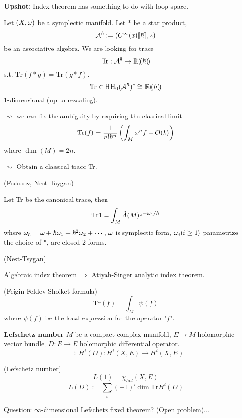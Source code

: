 \textbf{Upshot:} Index theorem has something to do with loop space.

Let $(X,\omega)$ be a symplectic manifold. Let $*$ be a star product,
$$\mathcal{A}^\hbar:=(C^\infty(x)[\![\hbar]\!],*)$$
be an associative algebra. We are looking for trace
$$\text{Tr}:\mathcal{A}^\hbar\to\mathbb{R}(\!(\hbar)\!)$$
s.t. $\text{Tr}(f*g)=\text{Tr}(g*f)$. 
$$
  \text{Tr}\in\operatorname{HH}_0(\mathcal{A}^\hbar)^*
\cong\mathbb{R}(\!(\hbar)\!)
$$
$1$-dimensional (up to rescaling).

$\rightsquigarrow$ we can fix the ambiguity by requiring the classical limit
$$
  \text{Tr}(f)
=
  \frac{1}{n!\hbar^n}
  \left(
    \int_M \omega^nf+O(\hbar)
  \right)
$$
where $\dim(M)=2n$.

$\rightsquigarrow$ Obtain a classical trace Tr.

\begin{thm}(Fedosov, Nest-Tsygan)

Let Tr be the canonical trace, then
$$
  \text{Tr}1
=
  \int_M
    \hat{A}(M)e^{-\omega_\hbar/\hbar}
$$
where $\omega_\hbar=\omega+\hbar\omega_1+\hbar^2\omega_2+\cdots$,
$\omega$ is symplectic form, $\omega_i(i\geq 1)$ parametrize the choice of $*$,
are closed $2$-forms.
\end{thm}

\begin{thm}(Nest-Tsygan)

Algebraic index theorem $\Rightarrow$ Atiyah-Singer analytic index theorem.
\end{thm}

\begin{rem}(Feigin-Feldev-Shoiket formula)
$$
  \text{Tr}(f)
=
  \int_M
    \psi(f)
$$
where $\psi(f)$ be the local expression for the operator "$f$".
\end{rem}

\textbf{Lefschetz number} $M$ be a compact complex manifold,
$E\to M$ holomorphic vector bundle, $D:E\to E$ 
holomorphic differential operator.
$$
  \Rightarrow
  H^i(D):H^i(X,E)\to H^i(X,E)
$$

\begin{definition}(Lefschetz number)
$$L(1)=\chi_{hol}(X,E)$$
$$
  L(D):=\sum_i(-1)^i\dim \text{Tr}H^i(D)
$$
\end{definition}

Question: $\infty$-dimensional Lefschetz fixed theorem?
(Open problem)...



